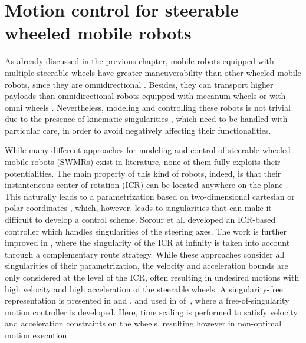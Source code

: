 \section{Motion control for steerable wheeled mobile robots}
As already discussed in the previous chapter, mobile robots equipped with
multiple steerable wheels
have greater maneuverability than other wheeled mobile robots, since they are
omnidirectional \cite{RobuffoGiordano2009ICRA}. Besides, they can transport
higher payloads than omnidirectional robots equipped with mecanum wheels
\cite{Dickerson1991ControlOminidirectionalRobotwithMecaumWheels} or
with omni wheels \cite{Blumrich1974OmnidirectionalWheel}.
Nevertheless, modeling and controlling these robots is not
trivial due to the presence of kinematic singularities \cite{Sorour2017RAL},
which need to be handled with particular care, in order to avoid negatively
affecting their functionalities.

While many different approaches for modeling and control of steerable wheeled
mobile robots (SWMRs) exist in literature, none of them fully exploits their
potentialities. The main property of this kind of robots, indeed, is that their
instanteneous center of rotation (ICR) can be located anywhere on the plane
\cite{Campion1996TR}. This naturally leads to a parametrization based on
two-dimensional cartesian \cite{Sorour2016ICRA} or polar coordinates
\cite{Connette2008CDC}, which, however, leads to singularities that can make
it difficult to develop a control scheme. Sorour et al. \cite{Sorour2017RAL}
developed an ICR-based controller which handles singularities of the steering
axes. The work is further improved in \cite{Sorour2019RAS}, where the
singularity of the ICR at infinity is taken into account through a
complementary route strategy. While these approaches consider all singularities
of their parametrization, the velocity and acceleration bounds are only
considered at the level of the ICR, often resulting in undesired motions with
high velocity and high acceleration of the steerable wheels.
A singularity-free representation is presented in \cite{Ferland2010IROS}
and \cite{Clavien2018EstimationoftheICR}, and used in
of~\cite{Clavien2018ICRMotionControl}, where a free-of-singularity motion
controller is developed. Here, time scaling is performed to satisfy velocity
and acceleration constraints on the wheels, resulting however in
non-optimal motion execution.
